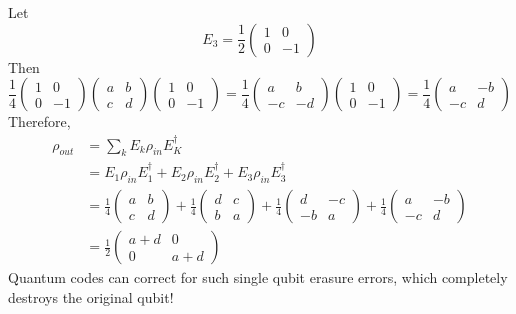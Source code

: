 Let 
\begin{equation}
    E_3 = \frac{1}{2}\begin{pmatrix}1 & 0 \\ 0 & -1\end{pmatrix}
\end{equation}
Then 
\begin{equation}
    \frac{1}{4}\begin{pmatrix}1 & 0\\ 0 & -1\end{pmatrix}  \begin{pmatrix}a & b \\ c & d\end{pmatrix} \begin{pmatrix}1 & 0 \\ 0 & -1\end{pmatrix}  = \frac{1}{4} \begin{pmatrix}a & b  \\ -c & -d\end{pmatrix} \begin{pmatrix}1 & 0 \\ 0 & -1\end{pmatrix} = \frac{1}{4} \begin{pmatrix}a & -b \\ -c & d\end{pmatrix}
\end{equation}
Therefore,
\begin{align}
    \rho_{out} &= \sum_k E_k \rho_{in}E_K^\dagger \\ 
    &= E_1\rho_{in}E_1^\dagger + E_2\rho_{in}E_2^\dagger + E_3\rho_{in}E_3^\dagger \\ 
    &= \frac{1}{4} \begin{pmatrix}a & b \\ c & d\end{pmatrix} + \frac{1}{4} \begin{pmatrix}d & c \\ b & a\end{pmatrix} + \frac{1}{4} \begin{pmatrix}d & -c \\ -b & a\end{pmatrix} + \frac{1}{4} \begin{pmatrix}a & -b \\ -c & d\end{pmatrix} \\
    &= \frac{1}{2} \begin{pmatrix}a+d & 0 \\ 0 & a+d\end{pmatrix}
\end{align}
Quantum codes can correct for such single qubit erasure errors, which completely destroys the original qubit!



